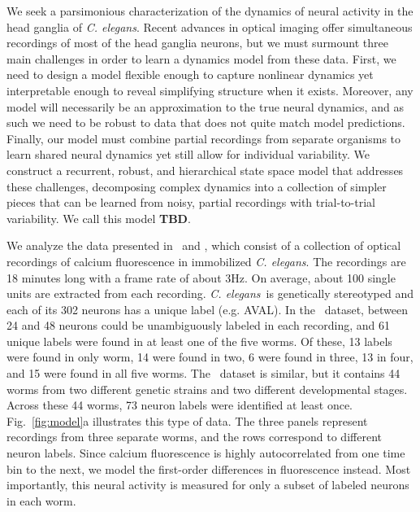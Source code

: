 \documentclass[11pt]{article}
\newcommand{\celegans}{\textit{C. elegans}}
\begin{document}
We seek a parsimonious characterization of the dynamics of neural
activity in the head ganglia of \celegans. Recent advances in optical
imaging offer simultaneous recordings of most of the head ganglia
neurons, but we must surmount three main challenges in order to learn
a dynamics model from these data.  First, we need to design a model
flexible enough to capture nonlinear dynamics yet interpretable enough
to reveal simplifying structure when it exists.  Moreover, any model
will necessarily be an approximation to the true neural dynamics, and
as such we need to be robust to data that does not quite match model
predictions.  Finally, our model must combine partial recordings from
separate organisms to learn shared neural dynamics yet still allow for
individual variability. We construct a recurrent, robust, and
hierarchical state space model that addresses these challenges,
decomposing complex dynamics into a collection of simpler pieces that
can be learned from noisy, partial recordings with trial-to-trial
variability.  We call this model \textbf{TBD}.

We analyze the data presented in~\citet{kato2015global} and
\citet{nichols2017global}, which consist of a collection of optical
recordings of calcium fluorescence in immobilized \celegans. The
recordings are 18 minutes long with a frame rate of about 3Hz.  On
average, about 100 single units are extracted from each
recording. \celegans~is genetically stereotyped and each of its 302
neurons has a unique label (e.g. \textsf{AVAL}). In
the~\citet{kato2015global} dataset, between 24 and 48 neurons could be
unambiguously labeled in each recording, and 61 unique labels were
found in at least one of the five worms.  Of these, 13 labels were
found in only worm, 14 were found in two, 6 were found in three, 13 in
four, and 15 were found in all five
worms. The~\citet{nichols2017global} dataset is similar, but it
contains 44 worms from two different genetic strains and two different
developmental stages.  Across these 44 worms, 73 neuron labels were
identified at least once. Fig.~\ref{fig:model}a illustrates this type
of data. The three panels represent recordings from three separate
worms, and the rows correspond to different neuron labels. Since
calcium fluorescence is highly autocorrelated from one time bin to the
next, we model the first-order differences in fluorescence instead.
Most importantly, this neural activity is measured for only a subset
of labeled neurons in each worm.
\end{document}
